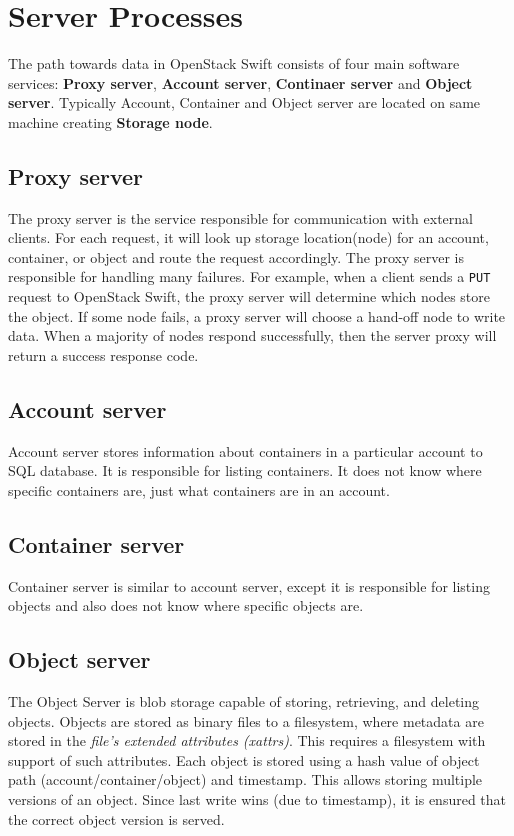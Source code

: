     \section{Server Processes}
    The path towards data in OpenStack Swift consists of four main software services: \textbf{Proxy server}, \textbf{Account server}, \textbf{Continaer server} and \textbf{Object server}. Typically Account, Container and Object server are located on same machine creating \textbf{Storage node}.

    \subsection{Proxy server}
    The proxy server is the service responsible for communication with external clients. For each request, it will look up storage location(node) for an account, container, or object and route the request accordingly\cite{SwiftArchitecturalOverview}. The proxy server is responsible for handling many failures. For example, when a client sends a \texttt{PUT} request to OpenStack Swift, the proxy server will determine which nodes store the object. If some node fails, a proxy server will choose a hand-off node to write data. When a majority of nodes respond successfully, then the server proxy will return a success response code\cite{swiftOpenStackSwift}.

    \subsection{Account server}
    Account server stores information about containers in a particular account to SQL database. It is responsible for listing containers. It does not know where specific containers are, just what containers are in an account\cite{SwiftArchitecturalOverview}.

    \subsection{Container server}
    Container server is similar to account server, except it is responsible for listing objects and also does not know where specific objects are\cite{SwiftArchitecturalOverview}.

    \subsection{Object server}
    The Object Server is blob storage capable of storing, retrieving, and deleting objects. Objects are stored as binary files to a filesystem, where metadata are stored in the \textit{file's extended attributes (xattrs)}. This requires a filesystem with support of such attributes. Each object is stored using a hash value of object path (account/container/object) and timestamp. This allows storing multiple versions of an object. Since last write wins (due to timestamp), it is ensured that the correct object version is served\cite{SwiftArchitecturalOverview}.

